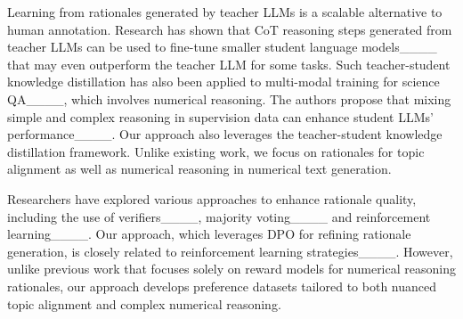 Learning from rationales generated by teacher LLMs is a scalable alternative to human annotation. 
Research has shown that CoT reasoning steps generated from teacher LLMs can be used to fine-tune smaller student language models____ that 
may even outperform the teacher LLM for some tasks.
Such teacher-student knowledge distillation has also been applied to multi-modal training for science QA____, which involves numerical reasoning.
The authors propose that mixing simple and complex reasoning in supervision data can enhance student LLMs' performance____. 
Our approach also leverages the teacher-student knowledge distillation framework. 
Unlike existing work, we focus on rationales for topic alignment as well as numerical reasoning in numerical text generation.

Researchers have explored various approaches to enhance rationale quality, including the use of verifiers____, majority voting____ and reinforcement learning____. 
Our approach, which leverages DPO for refining rationale generation, is closely related to reinforcement learning strategies____. 
However, unlike previous work that focuses solely on reward models for numerical reasoning rationales, our approach develops preference datasets tailored to both nuanced topic alignment and complex numerical reasoning. 


